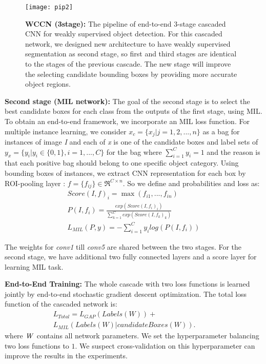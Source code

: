 \documentclass[10pt,twocolumn,letterpaper]{article}
\begin{document}
 \begin{figure*}[ht]
 \centering
 \texttt{[image: pip2]}
 \caption{\textbf{WCCN (3stage):} The pipeline of end-to-end 3-stage cascaded CNN for weakly supervised object detection. For this cascaded network, we designed new architecture to have weakly supervised segmentation as second stage, so first and third stages are identical to the stages of the previous cascade. The new stage will improve the selecting candidate bounding boxes by providing more accurate object regions.}
  \label{fig:3}
 \end{figure*}
 
\textbf{Second stage (MIL network):} The goal of the second stage is to select the best candidate boxes for each class from the outputs of the first stage, using MIL. To obtain an end-to-end framework, we incorporate an MIL loss function. For multiple instance learning, we consider $x_{c}=\{x_{j}|j = 1,2,..., n\}$ as a bag for instances of image \textit{I} and each of \textit{x} is one of the candidate boxes and label sets of $y_{x}=\{y_{i}|y_{i} \in \{0,1\}, i =1,...,C\}$ for the bag where ${\sum_{i=1}^C y_{i} = 1}$ and the reason is that each positive bag should belong to one specific object category. Using bounding boxes of instances, we extract CNN representation for each box by ROI-pooling layer \cite{fastRCNN}: $f = \{f_{ij}\} \in \Re^{C\times n}$. So we define and probabilities and loss as: 
\begin{equation}
\begin{split}
Score(I,f)_{i}=\max(f_{i1},..., f_{in}) \\
P(I,f_{i}) = \frac{exp(Score(I,f_{i})_{i})}{\sum_{{k=1}}^C exp(Score(I,f_{k})_{k})} \\ 
L_{MIL}(P,y) = -\sum_{{i=1}}^C y_{i} log(P(I,f_{i}))
\end{split}
\label{eq:1}
\end{equation}

The weights for \textit{conv1} till \textit{conv5} are shared between the two stages. For the second stage, we have additional two fully connected layers and a score layer for learning MIL task.

\textbf{End-to-End Training:} The whole cascade with two loss functions is learned jointly by end-to-end stochastic gradient descent optimization. The total loss function of the cascaded network is:
\begin{equation}
\begin{split}
L_{Total} = L_{GAP}(Labels(W))+ \qquad  \qquad  \qquad  \qquad\\
L_{MIL}(Labels(W)|candidate Boxes(W)).
\label{eq:2}
\end{split}
\end{equation}
\noindent where $\it{W}$ contains all network parameters. We set the hyperparameter balancing two loss functions to $1$. We suspect cross-validation on this hyperparameter can improve the results in the experiments.
\end{document}
